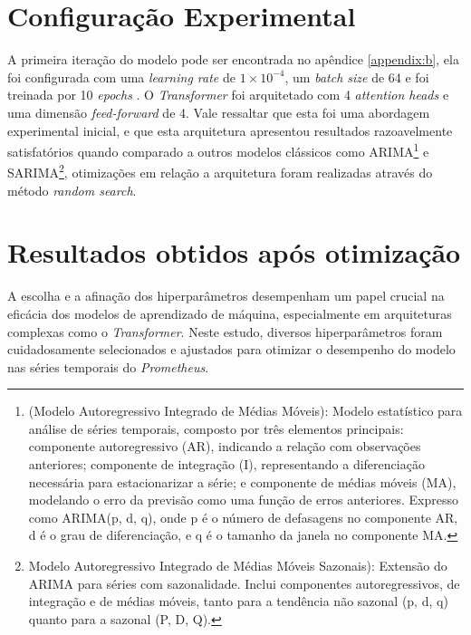 \section{Configuração Experimental}
A primeira iteração do modelo pode ser encontrada no apêndice \ref{appendix:b}, ela foi configurada com uma \textit{learning rate} de \(1 \times 10^{-4}\), um \textit{batch size} de 64 e foi treinada por 10 \textit{epochs}
. O \textit{Transformer} foi arquitetado com 4 \textit{attention heads} e uma dimensão \textit{feed-forward} de 4. Vale ressaltar que esta foi uma abordagem experimental inicial, e que esta arquitetura apresentou resultados razoavelmente satisfatórios quando comparado a outros modelos clássicos como ARIMA\footnote{(Modelo Autoregressivo Integrado de Médias Móveis): Modelo estatístico para análise de séries temporais, composto por três elementos principais: componente autoregressivo (AR), indicando a relação com observações anteriores; componente de integração (I), representando a diferenciação necessária para estacionarizar a série; e componente de médias móveis (MA), modelando o erro da previsão como uma função de erros anteriores. Expresso como ARIMA(p, d, q), onde p é o número de defasagens no componente AR, d é o grau de diferenciação, e q é o tamanho da janela no componente MA.} e SARIMA\footnote{Modelo Autoregressivo Integrado de Médias Móveis Sazonais): Extensão do ARIMA para séries com sazonalidade. Inclui componentes autoregressivos, de integração e de médias móveis, tanto para a tendência não sazonal (p, d, q) quanto para a sazonal (P, D, Q).},  otimizações em relação a arquitetura foram realizadas através do método \textit{random search}.

\section{Resultados obtidos após otimização}
A escolha e a afinação dos hiperparâmetros desempenham um papel crucial na eficácia dos modelos de aprendizado de máquina, especialmente em arquiteturas complexas como o \textit{Transformer}. Neste estudo, diversos hiperparâmetros foram cuidadosamente selecionados e ajustados para otimizar o desempenho do modelo nas séries temporais do \textit{Prometheus}.


